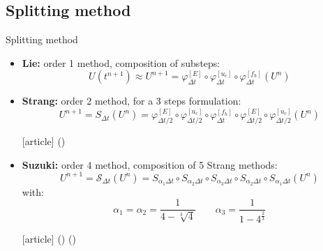 \documentclass{beamer}
\newcommand{\mbold}[1]{{\textbf{\color{PLB}#1}}}
\newcommand{\customcite}[1]{\citeauthor{#1} (\citeyear{#1})}
\begin{document}
\subsection{Splitting method}
\begin{frame}{Splitting method}
  \begin{itemize}
    \item \mbold{Lie:} order 1 method, composition of substeps: $$U(t^{n+1})\approx U^{n+1} = \varphi^{[E]}_{\Delta t} \circ \varphi^{[u_c]}_{\Delta t} \circ \varphi^{[f_h]}_{\Delta t}(U^n)$$
    \item \mbold{Strang:} order 2 method, for a 3 steps formulation: $$U^{n+1} = S_{\Delta t}(U^n) = \varphi^{[E]}_{\Delta t/2} \circ \varphi^{[u_c]}_{\Delta t/2} \circ \varphi^{[f_h]}_{\Delta t} \circ \varphi^{[E]}_{\Delta t/2} \circ \varphi^{[u_c]}_{\Delta t/2} (U^n) $$ \begin{thebibliography}{9}
    [article]
     \customcite{Strang:1968}
  \end{thebibliography}
    \item \mbold{Suzuki:} order 4 method, composition of 5 Strang methods: $$
      U^{n+1} = \mathcal{S}_{\Delta t}(U^n) = S_{\alpha_1\Delta t} \circ S_{\alpha_2\Delta t} \circ S_{\alpha_3\Delta t} \circ S_{\alpha_2\Delta t} \circ S_{\alpha_1\Delta t} (U^n)
    $$with: $$ \alpha_1 = \alpha_2 = \frac{1}{4 - \sqrt[3]{4}} \qquad \alpha_3 = \frac{1}{1- 4^{\frac{2}{3}}}$$ \begin{thebibliography}{9}
    [article]
     \customcite{Suzuki:1990}
     \customcite{Casas:2020}
  \end{thebibliography}
  \end{itemize}
\end{frame}
\end{document}
